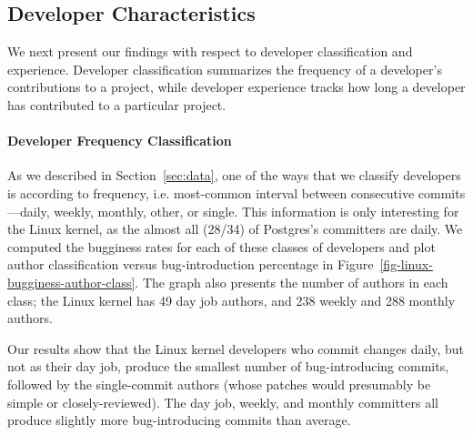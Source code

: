

\subsection{Developer Characteristics}
We next present our findings with respect to developer classification
and experience.  Developer classification summarizes the frequency of
a developer's contributions to a project, while developer experience
tracks how long a developer has contributed to a particular project.

\paragraph{Developer Frequency Classification} 
As we described in Section~\ref{sec:data}, one of the ways that we
classify developers is according to frequency, i.e. most-common
interval between consecutive commits---daily, weekly, monthly, other,
or single.  This information is only interesting for the Linux kernel, as the
almost all (28/34) of Postgres's committers are daily. We computed the
bugginess rates for each of these classes of developers and plot
author classification versus bug-introduction percentage in
Figure~\ref{fig-linux-bugginess-author-class}. The graph also presents
the number of authors in each class; the Linux kernel has 49 day job authors,
and 238 weekly and 288 monthly authors.

Our results show that the Linux kernel developers who commit changes daily, but
not as their day job, produce the smallest number of bug-introducing
commits, followed by the single-commit authors (whose patches would
presumably be simple or closely-reviewed). The day job, weekly, and
monthly committers all produce slightly more bug-introducing commits
than average.


